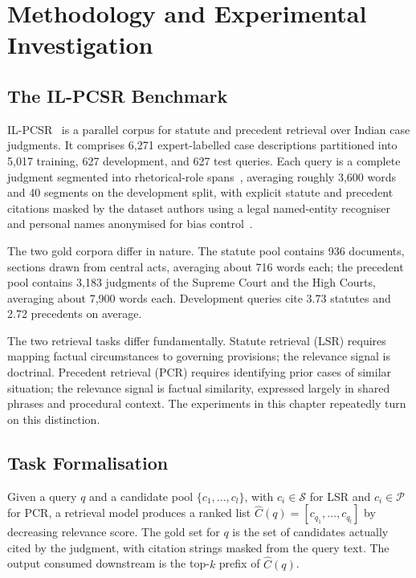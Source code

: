 \documentclass{mnnit}
\begin{document}
\chapter{Methodology and Experimental Investigation}

\section{The IL-PCSR Benchmark}
IL-PCSR~\cite{ilpcsr} is a parallel corpus for statute and
precedent retrieval over Indian case judgments. It comprises
6,271 expert-labelled case descriptions partitioned into 5,017
training, 627 development, and 627 test queries. Each query is a
complete judgment segmented into rhetorical-role
spans~\cite{malik2022rr,kalamkar2022corpus}, averaging roughly
3,600 words and 40 segments on the development split, with
explicit statute and precedent citations masked by the dataset
authors using a legal named-entity recogniser and personal names
anonymised for bias control~\cite{kalamkar2022legalner}.

The two gold corpora differ in nature. The statute pool contains
936 documents, sections drawn from central acts, averaging about
716 words each; the precedent pool contains 3,183 judgments of
the Supreme Court and the High Courts, averaging about 7,900
words each. Development queries cite 3.73 statutes and 2.72
precedents on average.

The two retrieval tasks differ fundamentally. Statute retrieval
(LSR) requires mapping factual circumstances to governing
provisions; the relevance signal is doctrinal. Precedent
retrieval (PCR) requires identifying prior cases of similar
situation; the relevance signal is factual similarity, expressed
largely in shared phrases and procedural context. The experiments
in this chapter repeatedly turn on this distinction.

\section{Task Formalisation}
Given a query $q$ and a candidate pool $\{c_1,\dots,c_l\}$, with
$c_i \in \mathcal{S}$ for LSR and $c_i \in \mathcal{P}$ for PCR,
a retrieval model produces a ranked list
$\hat{C}(q) = [c_{q_1}, \dots, c_{q_l}]$ by decreasing relevance
score. The gold set for $q$ is the set of candidates actually
cited by the judgment, with citation strings masked from the
query text. The output consumed downstream is the top-$k$ prefix
of $\hat{C}(q)$.
\end{document}

